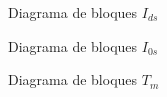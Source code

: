\documentclass[a4paper, 10pt, onecolumn,journal]{ieeeconf}
\begin{document}
\begin{figure}[thpb]
    \centering
    \begin{adjustbox}{max width=\columnwidth}
    \end{adjustbox}
    \caption{Diagrama de bloques $I_{ds}$}
    \label{diagrama de bloques I_ds}
\end{figure}

\begin{figure}[thpb]
    \centering
    \begin{adjustbox}{max width=\columnwidth}
    \end{adjustbox}
    \caption{Diagrama de bloques $I_{0s}$}
    \label{diagrama de bloques I_0s}
\end{figure}

\begin{figure}[thpb]
    \centering
    \begin{adjustbox}{max width=\columnwidth}
    \end{adjustbox}
    \caption{Diagrama de bloques $T_m$}
    \label{diagrama de bloques T_m}
\end{figure}
\end{document}
